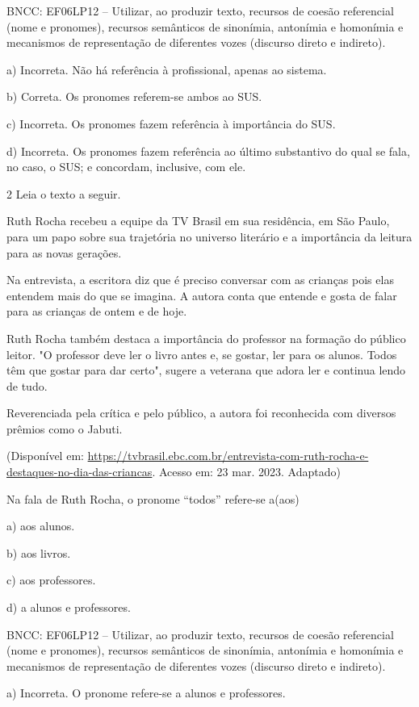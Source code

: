 BNCC: EF06LP12 -- Utilizar, ao produzir texto, recursos de coesão
referencial (nome e pronomes), recursos semânticos de sinonímia,
antonímia e homonímia e mecanismos de representação de diferentes vozes
(discurso direto e indireto).

a) Incorreta. Não há referência à profissional, apenas ao sistema.

b) Correta. Os pronomes referem-se ambos ao SUS.

c) Incorreta. Os pronomes fazem referência à importância do SUS.

d) Incorreta. Os pronomes fazem referência ao último substantivo do qual
se fala, no caso, o SUS; e concordam, inclusive, com ele.

\num{2} Leia o texto a seguir.

Ruth Rocha recebeu a equipe da TV Brasil em sua residência, em São
Paulo, para um papo sobre sua trajetória no universo literário e a
importância da leitura para as novas gerações.

Na entrevista, a escritora diz que é preciso conversar com as crianças
pois elas entendem mais do que se imagina. A autora conta que entende e
gosta de falar para as crianças de ontem e de hoje.

Ruth Rocha também destaca a importância do professor na formação do
público leitor. "O professor deve ler o livro antes e, se gostar, ler
para os alunos. Todos têm que gostar para dar certo", sugere a veterana
que adora ler e continua lendo de tudo.

Reverenciada pela crítica e pelo público, a autora foi reconhecida com
diversos prêmios como o Jabuti.

(Disponível em: 
\url{https://tvbrasil.ebc.com.br/entrevista-com-ruth-rocha-e-destaques-no-dia-das-criancas}.
Acesso em: 23 mar. 2023. Adaptado)

Na fala de Ruth Rocha, o pronome ``todos'' refere-se a(aos)

a) aos alunos.

b) aos livros.

c) aos professores.

d) a alunos e professores.

BNCC: EF06LP12 -- Utilizar, ao produzir texto, recursos de coesão
referencial (nome e pronomes), recursos semânticos de sinonímia,
antonímia e homonímia e mecanismos de representação de diferentes vozes
(discurso direto e indireto).

a) Incorreta. O pronome refere-se a alunos e professores.

